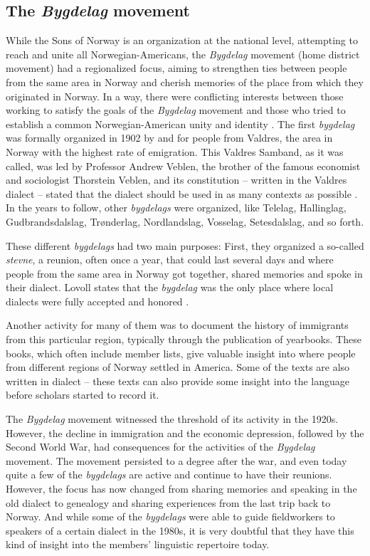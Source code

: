 \documentclass[output=paper]{langscibook}
\begin{document}
\subsection{The \textit{Bygdelag} movement}\label{sec:hjelde:6.4}

While the Sons of Norway is an organization at the national level, attempting to reach and unite all Norwegian\hyp Americans, the \textit{Bygdelag} movement (home district movement) had a regionalized focus, aiming to strengthen ties between people from the same area in Norway and cherish memories of the place from which they originated in Norway. In a way, there were conflicting interests between those working to satisfy the goals of the \textit{Bygdelag} movement and those who tried to establish a common Norwegian\hyp American unity and identity \citep[18--19]{Lovoll1977}. The first \textit{bygdelag} was formally organized in 1902 by and for people from Valdres, the area in Norway with the highest rate of emigration. This Valdres Samband, as it was called, was led by Professor Andrew Veblen, the brother of the famous economist and sociologist Thorstein Veblen, and its constitution – written in the Valdres dialect – stated that the dialect should be used in as many contexts as possible \citep[30--31]{Lovoll1977}. In the years to follow, other \textit{bygdelags} were organized, like Telelag, Hallinglag, Gudbrandsdalslag, Trønderlag, Nordlandslag, Vosselag, Setesdalslag, and so forth. 

These different \textit{bygdelags} had two main purposes: First, they organized a so-called \textit{stevne}, a reunion, often once a year, that could last several days and where people from the same area in Norway got together, shared memories and spoke in their dialect. Lovoll states that the \textit{bygdelag} was the only place where local dialects were fully accepted and honored \citep[19]{Lovoll1977}. 

Another activity for many of them was to document the history of immigrants from this particular region, typically through the publication of yearbooks. These books, which often include member lists, give valuable insight into where people from different regions of Norway settled in America. Some of the texts are also written in dialect – these texts can also provide some insight into the language before scholars started to record it.

The \textit{Bygdelag} movement witnessed the threshold of its activity in the 1920s. However, the decline in immigration and the economic depression, followed by the Second World War, had consequences for the activities of the \textit{Bygdelag} movement. The movement persisted to a degree after the war, and even today quite a few of the \textit{bygdelags} are active and continue to have their reunions. However, the focus has now changed from sharing memories and speaking in the old dialect to genealogy and sharing experiences from the last trip back to Norway. And while some of the \textit{bygdelags} were able to guide fieldworkers to speakers of a certain dialect in the 1980s, it is very doubtful that they have this kind of insight into the members’ linguistic repertoire today.
\end{document}

